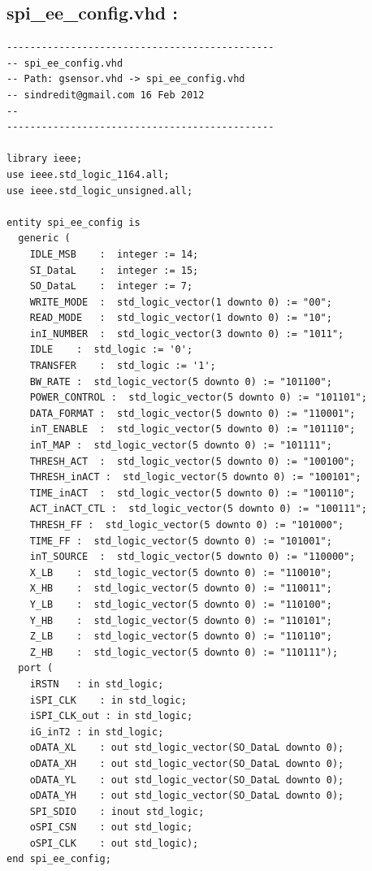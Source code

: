 \documentclass[12pt,a4paper,hyperlinks]{rapport_unif}
\begin{document}
\subsection*{spi\_ee\_config.vhd :}
\begin{lstlisting}
----------------------------------------------
-- spi_ee_config.vhd
-- Path: gsensor.vhd -> spi_ee_config.vhd
-- sindredit@gmail.com 16 Feb 2012
-- 
----------------------------------------------

library ieee;
use ieee.std_logic_1164.all;
use ieee.std_logic_unsigned.all;

entity spi_ee_config is
  generic (
    IDLE_MSB	:  integer := 14;    
    SI_DataL	:  integer := 15;    
    SO_DataL	:  integer := 7;    
    WRITE_MODE	:  std_logic_vector(1 downto 0) := "00";    
    READ_MODE	:  std_logic_vector(1 downto 0) := "10";    
    inI_NUMBER 	:  std_logic_vector(3 downto 0) := "1011";    
    IDLE	:  std_logic := '0';    
    TRANSFER	:  std_logic := '1';    
    BW_RATE	:  std_logic_vector(5 downto 0) := "101100";    
    POWER_CONTROL :  std_logic_vector(5 downto 0) := "101101";    
    DATA_FORMAT	:  std_logic_vector(5 downto 0) := "110001";    
    inT_ENABLE	:  std_logic_vector(5 downto 0) := "101110";    
    inT_MAP	:  std_logic_vector(5 downto 0) := "101111";    
    THRESH_ACT	:  std_logic_vector(5 downto 0) := "100100";    
    THRESH_inACT :  std_logic_vector(5 downto 0) := "100101";    
    TIME_inACT	:  std_logic_vector(5 downto 0) := "100110";    
    ACT_inACT_CTL :  std_logic_vector(5 downto 0) := "100111";    
    THRESH_FF :  std_logic_vector(5 downto 0) := "101000";    
    TIME_FF	:  std_logic_vector(5 downto 0) := "101001";    
    inT_SOURCE	:  std_logic_vector(5 downto 0) := "110000";    
    X_LB	:  std_logic_vector(5 downto 0) := "110010";    
    X_HB	:  std_logic_vector(5 downto 0) := "110011";    
    Y_LB	:  std_logic_vector(5 downto 0) := "110100";    
    Y_HB	:  std_logic_vector(5 downto 0) := "110101";    
    Z_LB	:  std_logic_vector(5 downto 0) := "110110";    
    Z_HB	:  std_logic_vector(5 downto 0) := "110111");    
  port (
    iRSTN	: in std_logic;   
    iSPI_CLK	: in std_logic;   
    iSPI_CLK_out : in std_logic;   
    iG_inT2	: in std_logic;   
    oDATA_XL	: out std_logic_vector(SO_DataL downto 0);   
    oDATA_XH	: out std_logic_vector(SO_DataL downto 0);
    oDATA_YL	: out std_logic_vector(SO_DataL downto 0);
    oDATA_YH	: out std_logic_vector(SO_DataL downto 0);   
    SPI_SDIO	: inout std_logic;   
    oSPI_CSN	: out std_logic;   
    oSPI_CLK	: out std_logic);   
end spi_ee_config;


\end{lstlisting}
\end{document}
